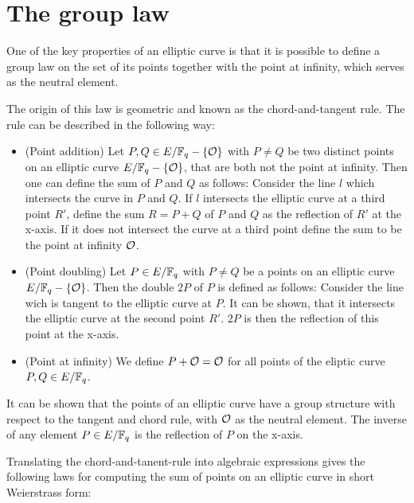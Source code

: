 \section{The group law}
One of the key properties of an elliptic curve is that it is possible to define a group law on the set of its points together with the point at infinity, which serves as the neutral element.

The origin of this law is geometric and known as the chord-and-tangent rule. The  rule can be described in the following way:
\begin{itemize}
\item (Point addition) Let $P, Q\in E/\mathbb{F}_q- \{\mathcal{O}\}$ with $P\neq Q$ be two distinct points on an elliptic curve $E/\mathbb{F}_q - \{\mathcal{O}\}$, that are both not the point at infinity. Then one can define the sum of $P$ and $Q$ as follows: Consider the line $l$ which intersects the curve in $P$ and $Q$. If $l$ intersects the elliptic curve at a third point $R'$, define the sum $R=P+Q$ of $P$ and $Q$ as the reflection of $R'$ at the x-axis. If it does not intersect the curve at a third point define the sum to be the point at infinity $\mathcal{O}$.
\item (Point doubling) Let $P \in E/\mathbb{F}_q$ with $P\neq Q$ be a points on an elliptic curve $E/\mathbb{F}_q - \{\mathcal{O}\}$. Then the double $2P$ of $P$ is defined as follows: Consider the line wich is tangent to the elliptic curve at $P$. It can be shown, that it intersects the elliptic curve at the second point $R'$. $2P$ is then the reflection of this point at the x-axis.
\item (Point at infinity) We define $P+\mathcal{O} = \mathcal{O}$ for all points of the eliptic curve $P, Q\in E/\mathbb{F}_q$.
\end{itemize}
It can be shown that the points of an elliptic curve have a group structure with respect to the tangent and chord rule, with $\mathcal{O}$ as the neutral element. The inverse of any element $P\in E/\mathbb{F}_q$ is the reflection of $P$ on the x-axis.

Translating the chord-and-tanent-rule into algebraic expressions gives the following laws for computing the sum of points on an elliptic curve in short Weierstrass form:

